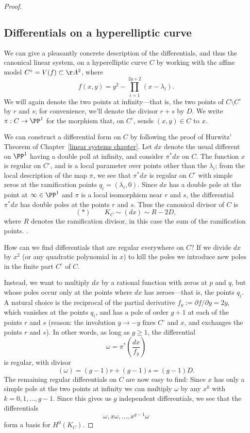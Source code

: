 \begin{proof}
  \subsection{Differentials on a hyperelliptic curve}\label{hyperelliptic differentials}

We can give a pleasantly concrete description of the differentials, and thus the canonical linear system, on a hyperelliptic curve $C$ by working with the affine model $C^\circ = V(f) \subset \AA^2$, where
$$
f(x,y) = y^2 - \prod_{i=1}^{2g+2} (x - \lambda_i).
$$
We will again denote the two points at infinity---that is, the two points of $C \setminus C^\circ$ by $r$ and $s$; for convenience, we'll denote the divisor $r+s$ by $D$. We write $\pi:C \to \PP^1$ for the morphism that, on $C^\circ$, sends $(x,y) \in C$ to $x$.

We can construct a differential form on $C$ by following the proof of Hurwitz' Theorem of Chapter~\ref{linear systems chapter}.
Let $dx$ denote the usual different on $\PP^1$ having a double poll at infinity, and consider $\pi^*dx$ on $C$.  The function $x$ is regular on $C^\circ$, and is a local parameter over points other than the $\lambda_i$; from the local description of the map $\pi$, we see that $\pi^*dx$ is regular on $C^\circ$  with simple zeros at the ramification points $q_i = (\lambda_i, 0)$. Since $dx$ has a double pole at the point at $\infty\in \PP^1$ and $\pi$ is a local isomorphism near $r$ and $s$, the differential $\pi^*dx$ has double poles at the points $r$ and $s$. Thus the canonical
divisor of $C$ is 
$$
(*) \qquad K_C \sim (dx) \sim R - 2D,
$$
where $R$ denotes the ramification divisor, in this case the sum of the ramification points. .

How can we find differentials that are regular everywhere on $C$? If we divide $dx$ by $x^2$ (or any quadratic polynomial in $x$) to kill the poles we  introduce new poles in the finite part $C^\circ$ of $C$. 

Instead, we want to multiply $dx$ by a rational function with zeros at $p$ and $q$, but whose poles occur only at the points where $dx$ has zeroes---that is, the points $q_i$.  A natural choice is the reciprocal of the partial derivative $f_y := \partial f/ \partial y = 2y$, which vanishes at the points $q_i$, and has  a pole of order $g+1$ at each of the points $r$ and $s$ (reason: the involution $y\to -y$ fixes $C^\circ$ and $x$, and exchanges the points $r$ and $s$). In other words, as long as $g \geq 1$, the differential
$$
\omega = \pi^*(\frac{dx}{f_y})
$$
is regular, with divisor
$$
(\omega) = (g-1)r + (g-1)s = (g-1)D.
$$
The remaining regular differentials on $C$ are now easy to find: Since $x$ has only a simple pole
at the two points at infinity we can  multiply $\omega$ by any $x^k$ with $k = 0, 1, \dots, g-1$. Since this gives us $g$ independent differentials, we see that the differentials
$$
\omega, x\omega, \dots, x^{g-1}\omega
$$
  form a basis for $H^0(K_C)$.


\end{proof}

